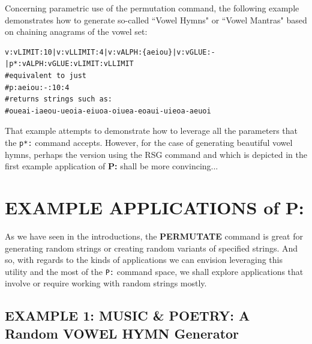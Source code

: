 \documentclass[a4paper, 18pt]{book} %
\begin{document}
{{\vspace{2em}

Concerning parametric use of the permutation command, the following example demonstrates how to generate so-called ``Vowel Hymns" or ``Vowel Mantras"\cite{lutalo_2025_grimlumtauto} based on chaining anagrams of the vowel set: 


\vspace{2em}

  \begin{tcolorbox}[teaterminalstyle, title=P: EXAMPLE 4: A Constrained Permutation Generator in TEA that generates ``Vowel Mantras", breakable]
  \begin{lstlisting}[language=TEA,breaklines=true,]
v:vLIMIT:10|v:vLLIMIT:4|v:vALPH:{aeiou}|v:vGLUE:-|p*:vALPH:vGLUE:vLIMIT:vLLIMIT
#equivalent to just
#p:aeiou:-:10:4
#returns strings such as:
#oueai-iaeou-ueoia-eiuoa-oiuea-eoaui-uieoa-aeuoi
   \end{lstlisting}
  \end{tcolorbox}

\vspace{2em}


That example attempts to demonstrate how to leverage all the parameters that the \texttt{p*:} command accepts. However, for the case of generating beautiful vowel hymns, perhaps the version using the RSG command and which is depicted in the first example application of \textbf{P:} shall be more convincing...





\section{EXAMPLE APPLICATIONS of P:}
\label{SECEXAMPP}

  
As we have seen in the introductions, the \textbf{PERMUTATE} command is great for generating random strings or creating random variants of specified strings. And so, with regards to the kinds of applications we can envision leveraging this utility and the most of the \texttt{P:} command space, we shall explore applications that involve or require working with random strings mostly.


\subsection{EXAMPLE 1: \textbf{MUSIC \& POETRY:} A Random VOWEL HYMN Generator}
\label{SECEXAMP1P}


}}
\end{document}
